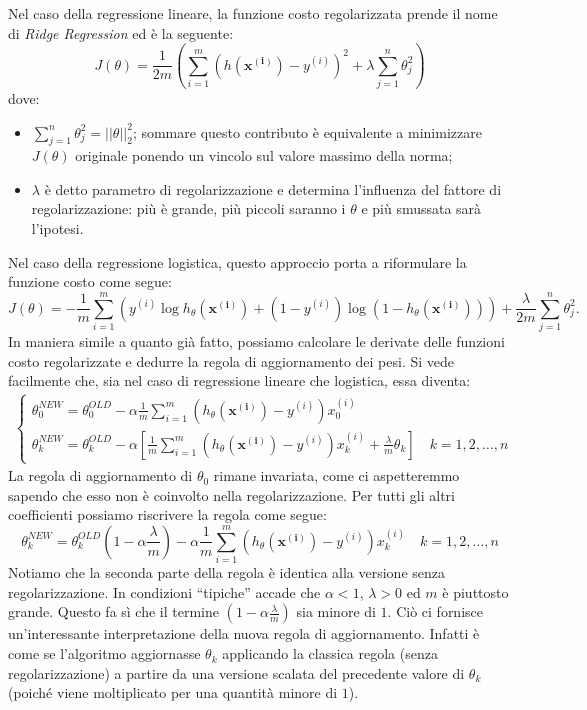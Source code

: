 Nel caso della regressione lineare, la funzione costo regolarizzata prende il nome di \emph{Ridge Regression} ed è la seguente:
\begin{equation}\label{eqJ_theta}
  J(\theta) = \frac{1}{2m} \left(\sum_{i=1}^m (h(\mathbf{x^{(i)}})-y^{(i)})^2 + \lambda \sum_{j=1}^n\theta_j^2\right)
\end{equation}
dove:
\begin{itemize}
\item $\sum_{j=1}^n\theta_j^2 = ||\theta||_2^2$; sommare questo contributo è equivalente a minimizzare $J(\theta)$ originale ponendo un vincolo sul valore massimo della norma;
\item $\lambda$ è detto parametro di regolarizzazione e determina l'influenza del fattore di regolarizzazione: più è grande, più piccoli saranno i $\theta$ e più smussata sarà l'ipotesi.
\end{itemize}
Nel caso della regressione logistica, questo approccio porta a riformulare la funzione costo come segue:
 \begin{equation*}
 J(\theta) = -\frac{1}{m}\sum_{i=1}^m \left( {y^{(i)}}\log{h_\theta(\mathbf{x^{(i)}})} + (1-y^{(i)})
 \log{(1 - h_\theta(\mathbf{x^{(i)}}))} \right) + \frac{\lambda}{2m}\sum_{j=1}^n\theta_j^2.
\end{equation*}
In maniera simile a quanto già fatto, possiamo calcolare le derivate delle funzioni costo regolarizzate e dedurre la regola di aggiornamento dei pesi. Si vede facilmente che, sia nel caso di regressione lineare che logistica, essa diventa:
\begin{gather*}\begin{cases}
\displaystyle\theta^{NEW}_0 = \theta^{OLD}_0 - \alpha \frac{1}{m} \sum_{i=1}^m \left(h_\theta(\mathbf{x^{(i)}}) - y^{(i)}\right)x_0^{(i)} \\
\displaystyle\theta^{NEW}_k = \theta^{OLD}_k - \alpha \left[ \frac{1}{m} \sum_{i=1}^m \left(h_\theta(\mathbf{x^{(i)}}) - y^{(i)}\right)x_k^{(i)}+\frac{\lambda}{m}\theta_k\right] \quad k=1,2,\dots,n
\end{cases}
\end{gather*}
La regola di aggiornamento di $\theta_0$ rimane invariata, come ci aspetteremmo sapendo che esso non è coinvolto nella regolarizzazione. Per tutti gli altri coefficienti possiamo riscrivere la regola come segue:
\begin{equation*}
\displaystyle\theta^{NEW}_k = \theta^{OLD}_k \left(1- \alpha\frac{\lambda}{m}\right) - \alpha \frac{1}{m} \sum_{i=1}^m \left(h_\theta(\mathbf{x^{(i)}}) - y^{(i)}\right)x_k^{(i)} \quad k=1,2,\dots,n
\end{equation*}
Notiamo che la seconda parte della regola è identica alla versione senza regolarizzazione. In condizioni ``tipiche'' accade che $\alpha<1$, $\lambda > 0$ ed $m$ è piuttosto grande. Questo fa sì che il termine $\left(1- \alpha\frac{\lambda}{m}\right)$ sia minore di $1$. Ciò ci fornisce un'interessante interpretazione della nuova regola di aggiornamento. Infatti è come se l'algoritmo aggiornasse $\theta_k$ applicando la classica regola (senza regolarizzazione) a partire da una versione scalata del precedente valore di $\theta_k$ (poiché viene moltiplicato per una quantità minore di $1$).

